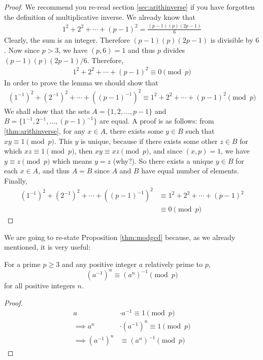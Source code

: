 \documentclass[12pt]{subfile}
\begin{document}
		\begin{proof}
			We recommend you re-read section \eqref{sec:arithinverse} if you have forgotten the definition of multiplicative inverse. We already know that
				\begin{align*}
					1^2+2^2+\cdots+(p-1)^2 = \frac{(p-1)(p)(2p-1)}{6}
				\end{align*}
			Clearly, the sum is an integer. Therefore $(p-1)(p)(2p-1)$ is divisible by $6$. Now since $p>3$, we have $(p,6)=1$ and thus $p$ divides $(p-1)(p)(2p-1)/6$. Therefore,
				\begin{align*}
					1^2+2^2+\cdots+(p-1)^2 \equiv 0 \pmod p
				\end{align*}
			In order to prove the lemma we should show that
				\begin{align*}
					(1^{-1})^2+(2^{-1})^2+\cdots+((p-1)^{-1})^2 \equiv 1^2+2^2+\cdots+(p-1)^2 \pmod p
				\end{align*}
			We shall show that the sets $A=\{1,2,\ldots,p-1\}$ and $B=\{1^{-1}, 2^{-1},\ldots,(p-1)^{-1}\}$ are equal. A proof is as follows: from \autoref{thm:arithinverse}, for any $x \in A$, there exists some $y \in B$ such that $xy \equiv 1 \pmod p$. This $y$ is unique, because if there exists some other $z \in B$ for which $xz \equiv 1 \pmod p$, then $xy \equiv xz \pmod p$, and since $(x,p)=1$, we have $y \equiv z \pmod p$ which means $y=z$ (why?). So there exists a unique $y\in B$ for each $x \in A$, and thus $A=B$ since $A$ and $B$ have equal number of elements. Finally,
				\begin{align*}
					(1^{-1})^2+(2^{-1})^2+\cdots+((p-1)^{-1})^2
						& \equiv 1^2+2^2+\cdots+(p-1)^2\\
						& \equiv 0 \pmod p
				\end{align*}
		\end{proof}
	We are going to re-state Proposition \ref{thm:modgcd} because, as we already mentioned, it is very useful:
		\begin{lemma}\label{lem:wolstproof3}
			For a prime $p\geq 3$ and any positive integer $a$ relatively prime to $p$,
			\[ (a^{-1})^n\equiv (a^n)^{-1} \pmod p\]
			for all positive integers $n$.
		\end{lemma}

		\begin{proof}
			\begin{align*}
				a
					& \cdot a^{-1} \equiv 1 \pmod p\\
				\implies a^n
					& \cdot (a^{-1})^n \equiv 1 \pmod p\\
				\implies(a^{-1})^n
					& \equiv (a^n)^{-1} \pmod p
			\end{align*}

		\end{proof}
\end{document}

